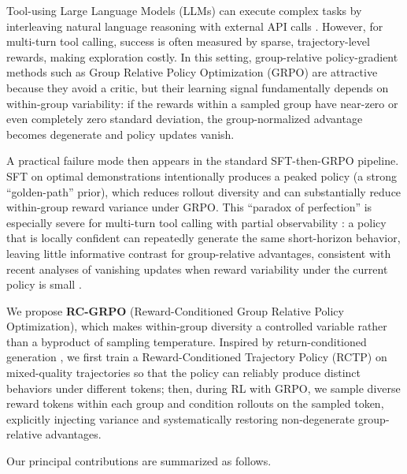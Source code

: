 \documentclass{article}
\theoremstyle{plain}
\theoremstyle{definition}
\theoremstyle{remark}
\begin{document}
Tool-using Large Language Models (LLMs) can execute complex tasks by interleaving natural language reasoning with external API calls \cite{yao2023react,schick2023toolformer,gorilla2023,qin2023toolllm}. However, for multi-turn tool calling, success is often measured by sparse, trajectory-level rewards, making exploration costly. In this setting, group-relative policy-gradient methods such as Group Relative Policy Optimization (GRPO) are attractive because they avoid a critic, but their learning signal fundamentally depends on within-group variability: if the rewards within a sampled group have near-zero or even completely zero standard deviation, the group-normalized advantage becomes degenerate and policy updates vanish.

A practical failure mode then appears in the standard SFT-then-GRPO pipeline. SFT on optimal demonstrations intentionally produces a peaked policy (a strong ``golden-path'' prior), which reduces rollout diversity and can substantially reduce within-group reward variance under GRPO. This ``paradox of perfection'' is especially severe for multi-turn tool calling with partial observability \cite{kaelbling1998planning,sutton2018reinforcement}: a policy that is locally confident can repeatedly generate the same short-horizon behavior, leaving little informative contrast for group-relative advantages, consistent with recent analyses of vanishing updates when reward variability under the current policy is small \cite{razin2024vanishing}.

We propose \textbf{RC-GRPO} (Reward-Conditioned Group Relative Policy Optimization), which makes within-group diversity a controlled variable rather than a byproduct of sampling temperature. Inspired by return-conditioned generation \cite{chen2021decision,schmidhuber2019reinforcement}, we first train a Reward-Conditioned Trajectory Policy (RCTP) on mixed-quality trajectories so that the policy can reliably produce distinct behaviors under different tokens; then, during RL with GRPO, we sample diverse reward tokens within each group and condition rollouts on the sampled token, explicitly injecting variance and systematically restoring non-degenerate group-relative advantages.

Our principal contributions are summarized as follows.
\end{document}
